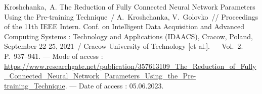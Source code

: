 Kroshchanka,~A. The Reduction of Fully Connected Neural Network Parameters Using the Pre-training Technique~/ A.~Kroshchanka, V.~Golovko~//
\newblock Proceedings of the 11th IEEE Intern. Conf. on Intelligent Data Acquisition and Advanced Computing Systems : Technology and Applications (IDAACS), Cracow, Poland, September 22-25, 2021~/
\newblock Cracow University of Technology [et al.]. ---
\newblock Vol.~2. ---
\newblock P.~937--941. ---
\newblock Mode of access : \url{https://www.researchgate.net/publication/357613109_The_Reduction_of_Fully_Connected_Neural_Network_Parameters_Using_the_Pre-training_Technique}. ---
\newblock Date of access : 05.06.2023.





